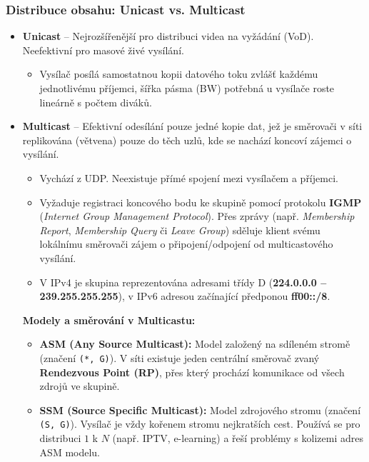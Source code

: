     \subsubsection{Distribuce obsahu: Unicast vs. Multicast}
        \begin{itemize}
            \item \textbf{Unicast} -- Nejrozšířenější pro distribuci videa na vyžádání (VoD). Neefektivní pro masové živé vysílání.
                \begin{itemize}
                    \item Vysílač posílá samostatnou kopii datového toku zvlášť každému jednotlivému příjemci, šířka pásma (BW) potřebná u vysílače roste lineárně s počtem diváků.
                \end{itemize}
                \item \textbf{Multicast} -- Efektivní odesílání pouze jedné kopie dat, jež je směrovači v síti replikována (větvena) pouze do těch uzlů, kde se nachází koncoví zájemci o vysílání.
                \begin{itemize}
                    \item Vychází z UDP. Neexistuje přímé spojení mezi vysílačem a příjemci.
                    \item Vyžaduje registraci koncového bodu ke skupině pomocí protokolu \textbf{IGMP} (\textit{Internet Group Management Protocol}). Přes zprávy (např. \textit{Membership Report}, \textit{Membership Query} či \textit{Leave Group}) sděluje klient svému lokálnímu směrovači zájem o připojení/odpojení od multicastového vysílání.
                    \item V IPv4 je skupina reprezentována adresami třídy D (\textbf{224.0.0.0 -- 239.255.255.255}), v IPv6 adresou začínající předponou \textbf{ff00::/8}.
                \end{itemize}
            \textbf{Modely a směrování v Multicastu:}
                \begin{itemize}
                    \item \textbf{ASM (Any Source Multicast):} Model založený na sdíleném stromě (značení \texttt{(*, G)}). V síti existuje jeden centrální směrovač zvaný \textbf{Rendezvous Point (RP)}, přes který prochází komunikace od všech zdrojů ve skupině.
                    \item \textbf{SSM (Source Specific Multicast):} Model zdrojového stromu (značení \texttt{(S, G)}). Vysílač je vždy kořenem stromu nejkratších cest. Používá se pro distribuci $1$ k $N$ (např. IPTV, e-learning) a řeší problémy s kolizemi adres ASM modelu.

\end{itemize}
\end{itemize}
